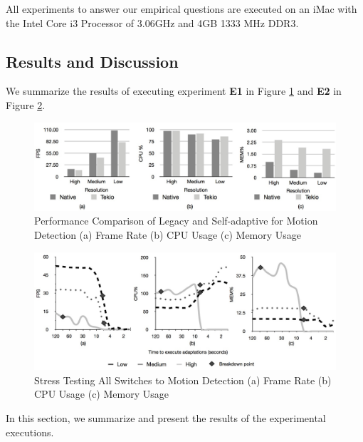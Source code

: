 All experiments to answer our empirical questions  are executed on an iMac with the Intel Core i3 Processor of 3.06GHz and 4GB 1333 MHz DDR3.
	
\subsection{Results and Discussion}
\label{sec:sec:resultsdiscussion}

We summarize the results of executing experiment \textbf{E1} in Figure \ref{fig:performanceComparison} and  \textbf{E2} in Figure \ref{fig:stressTesting}.
	\begin{figure}
		\includegraphics[scale=0.7]{images/MotionDetectionComparison.jpg} 
		\caption{Performance Comparison of Legacy and Self-adaptive for Motion Detection (a) Frame Rate (b) CPU Usage (c) Memory Usage }
		 \label{fig:performanceComparison} 
	\end{figure}
	
	\begin{figure}
		\includegraphics[scale=0.7]{images/StressTesting.jpg}
		 \caption{Stress Testing All Switches to Motion Detection (a) Frame Rate (b) CPU Usage (c) Memory Usage}
		 \label{fig:stressTesting} 
	\end{figure}


In this section, we summarize and present the results of the experimental executions. 


